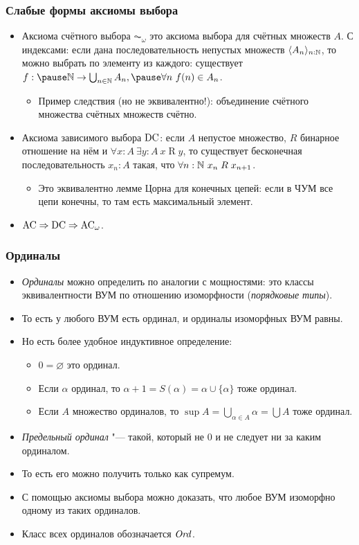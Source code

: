 \documentclass[10pt]{beamer}
\begin{document}
\begin{frame}
    \frametitle{Слабые формы аксиомы выбора}
    \begin{itemize}
        \item Аксиома счётного выбора $\AC_\omega$ это аксиома выбора для счётных множеств $A$. С индексами: если дана последовательность непустых множеств $\langle A_n \rangle_{n : \mathbb{N}}$, то можно выбрать по элементу из каждого: существует $f:\pause \N \to \bigcup_{n \in \N} A_n, \pause\forall n~f(n) \in A_n$.
        \begin{itemize}
            \item Пример следствия (но не эквивалентно!): объединение счётного множества счётных множеств счётно.
        \end{itemize}
        \pause
        \item Аксиома зависимого выбора $\mathrm{DC}$: если $A$ непустое множество, $R$ бинарное отношение на нём и $\forall x:A~\exists y:A~x \mathrel{R} y$, то существует бесконечная последовательность $x_n:A$ такая, что $\forall n:\mathbb{N}~x_n \mathrel{R} x_{n+1}$.
        \begin{itemize}
            \item Это эквивалентно лемме Цорна для конечных цепей: если в ЧУМ все цепи конечны, то там есть максимальный элемент.
        \end{itemize}
        \pause
        \item $\mathrm{AC} \Rightarrow \mathrm{DC} \Rightarrow \mathrm{AC}_\omega$.
    \end{itemize}
\end{frame}

\begin{frame}
    \frametitle{Ординалы}
    \begin{itemize}
        \item \emph{Ординалы} можно определить по аналогии с мощностями: это классы эквивалентности ВУМ по отношению изоморфности (\emph{порядковые типы}).
        \item То есть у любого ВУМ есть ординал, и ординалы изоморфных ВУМ равны.
        \item Но есть более удобное индуктивное определение:
        \begin{itemize}
            \item $0 = \varnothing$ это ординал.
            \item Если $\alpha$ ординал, то $\alpha + 1 = S(\alpha) = \alpha \cup \{\alpha\}$ тоже ординал.
            \item Если $A$ множество ординалов, то $\sup A = \bigcup_{\alpha\in A}\alpha = \bigcup A$ тоже ординал.
        \end{itemize}
        \item \emph{Предельный ординал} "--- такой, который не $0$ и не следует ни за каким ординалом.
        \item То есть его можно получить только как супремум.
        \item С помощью аксиомы выбора можно доказать, что любое ВУМ изоморфно одному из таких ординалов.
        \item Класс всех ординалов обозначается $\mathit{Ord}$.
    \end{itemize}
\end{frame}
\end{document}
